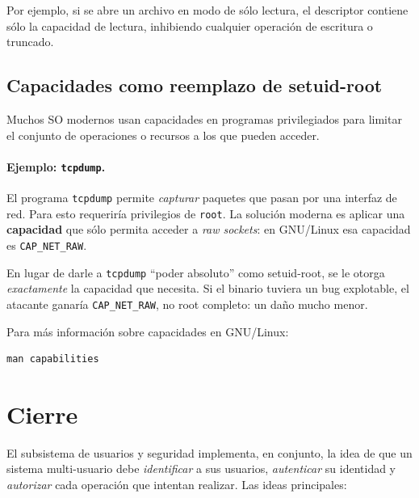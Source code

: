 \documentclass[11pt,a4paper]{article}
\begin{document}
Por ejemplo, si se abre un archivo en modo de sólo lectura, el
descriptor contiene sólo la capacidad de lectura, inhibiendo cualquier
operación de escritura o truncado.

\subsection{Capacidades como reemplazo de setuid-root}

Muchos SO modernos usan capacidades en programas privilegiados para
limitar el conjunto de operaciones o recursos a los que pueden
acceder.

\paragraph{Ejemplo: \texttt{tcpdump}.}
El programa \texttt{tcpdump} permite \emph{capturar} paquetes que
pasan por una interfaz de red. Para esto requeriría privilegios de
\texttt{root}. La solución moderna es aplicar una \textbf{capacidad}
que sólo permita acceder a \emph{raw sockets}: en GNU/Linux esa
capacidad es \verb|CAP_NET_RAW|.

\begin{idea}
En lugar de darle a \texttt{tcpdump} ``poder absoluto'' como
setuid-root, se le otorga \emph{exactamente} la capacidad que
necesita. Si el binario tuviera un bug explotable, el atacante
ganaría \verb|CAP_NET_RAW|, no root completo: un daño mucho menor.
\end{idea}

Para más información sobre capacidades en GNU/Linux:

\begin{lstlisting}[style=shellstyle]
man capabilities
\end{lstlisting}

\section{Cierre}

El subsistema de usuarios y seguridad implementa, en conjunto, la idea
de que un sistema multi-usuario debe \emph{identificar} a sus usuarios,
\emph{autenticar} su identidad y \emph{autorizar} cada operación que
intentan realizar. Las ideas principales:
\end{document}
